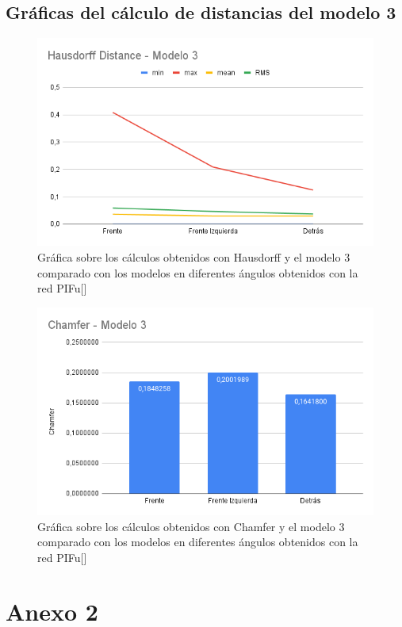 \subsection{Gráficas del cálculo de distancias del modelo 3}
\begin{figure}[H]
	\centering
	\includegraphics[scale=0.55]{imagenes/Hausdorff-M3.png}
	\caption{Gráfica sobre los cálculos obtenidos con Hausdorff y el modelo 3 comparado con los modelos en diferentes ángulos obtenidos con la red PIFu[\cite{pifu}]}
	\label{fig:figura18}
\end{figure}

\begin{figure}[H]
	\centering
	\includegraphics[scale=0.55]{imagenes/Chamfer-M3.png}
	\caption{Gráfica sobre los cálculos obtenidos con Chamfer y el modelo 3 comparado con los modelos en diferentes ángulos obtenidos con la red PIFu[\cite{pifu}]}
	\label{fig:figura19}
\end{figure}


\section{Anexo 2}

